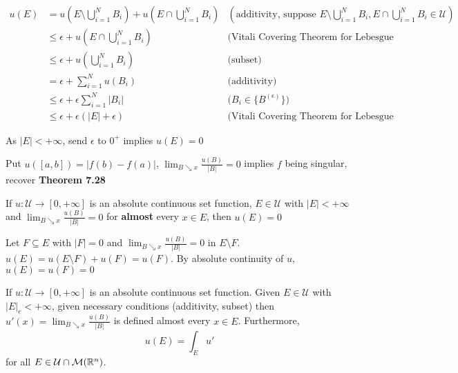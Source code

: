 \documentclass{article}
\begin{document}
\begin{align*}
    u(E)
    &= u\left(E \setminus \bigcup_{i=1}^N B_i \right) + u\left(E \cap \bigcup_{i=1}^N B_i \right) &\text{$\left( \text{additivity, suppose } E \setminus \bigcup_{i=1}^N B_i, E \cap \bigcup_{i=1}^N B_i \in \mathcal{U} \right)$} \\
    &\leq \epsilon + u\left(E \cap \bigcup_{i=1}^N B_i \right) &\text{(Vitali Covering Theorem for Lebesgue measure, absolute continuous)}\\
    &\leq \epsilon + u\left(\bigcup_{i=1}^N B_i \right) &\text{(subset)}\\
    &= \epsilon + \sum_{i=1}^N u(B_i) &\text{(additivity)} \\
    &\leq \epsilon + \epsilon \sum_{i=1}^N |B_i| &\text{($B_i \in \{B^{(\epsilon)} \}$)} \\
    &\leq \epsilon + \epsilon (|E| + \epsilon) &\text{(Vitali Covering Theorem for Lebesgue measure)}
\end{align*}

As $|E| < +\infty$, send $\epsilon$ to $0^+$ implies $u(E) = 0$

\begin{remark}
    Put $u([a, b]) = |f(b) - f(a)|$, $\lim_{B \searrow x} \frac{u(B)}{|B|} = 0$ implies $f$ being singular, recover \textbf{Theorem 7.28}    
\end{remark}


\begin{corollary}
    \label{corollary:2}
    If $u: \mathcal{U} \to [0, +\infty]$ is an absolute continuous set function, $E \in \mathcal{U}$ with $|E| < +\infty$ and $\lim_{B \searrow x} \frac{u(B)}{|B|} = 0$ for \textbf{almost} every $x \in E$, then $u(E) = 0$
\end{corollary}

Let $F \subseteq E$ with $|F| = 0$ and $\lim_{B \searrow x} \frac{u(B)}{|B|} = 0$ in $E \setminus F$. $u(E) = u(E \setminus F) + u(F) = u(F)$. By absolute continuity of $u$, $u(E) = u(F) = 0$





\begin{theorem}[Theorem 7.29]
    If $u: \mathcal{U} \to [0, +\infty]$ is an absolute continuous set function. Given $E \in \mathcal{U}$ with $|E|_e < +\infty$, given necessary conditions (additivity, subset) then $u'(x) = \lim_{B \searrow x} \frac{u(B)}{|B|}$ is defined almost every $x \in E$. Furthermore,
    \[
        u(E) = \int_E u'
    \]
    for all $E \in \mathcal{U} \cap \mathcal{M}(\mathbb{R}^n)$.
\end{theorem}
\end{document}
